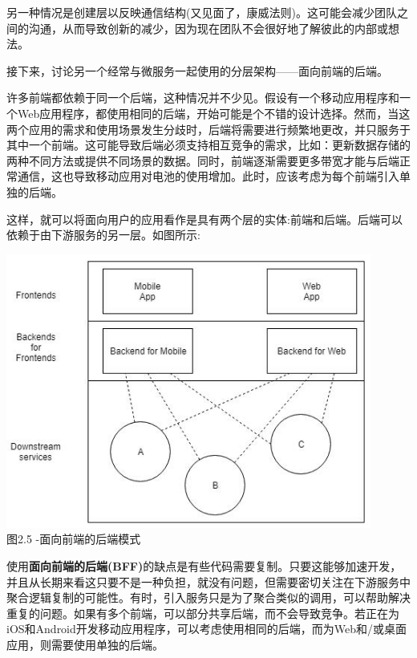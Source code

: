 另一种情况是创建层以反映通信结构(又见面了，康威法则)。这可能会减少团队之间的沟通，从而导致创新的减少，因为现在团队不会很好地了解彼此的内部或想法。

接下来，讨论另一个经常与微服务一起使用的分层架构——面向前端的后端。


许多前端都依赖于同一个后端，这种情况并不少见。假设有一个移动应用程序和一个Web应用程序，都使用相同的后端，开始可能是个不错的设计选择。然而，当这两个应用的需求和使用场景发生分歧时，后端将需要进行频繁地更改，并只服务于其中一个前端。这可能导致后端必须支持相互竞争的需求，比如：更新数据存储的两种不同方法或提供不同场景的数据。同时，前端逐渐需要更多带宽才能与后端正常通信，这也导致移动应用对电池的使用增加。此时，应该考虑为每个前端引入单独的后端。

这样，就可以将面向用户的应用看作是具有两个层的实体:前端和后端。后端可以依赖于由下游服务的另一层。如图所示:

\begin{center}
\includegraphics[width=0.9\textwidth]{content/1/chapter2/images/5.jpg}\\
图2.5 -面向前端的后端模式
\end{center}

使用\textbf{面向前端的后端(BFF)}的缺点是有些代码需要复制。只要这能够加速开发，并且从长期来看这只要不是一种负担，就没有问题，但需要密切关注在下游服务中聚合逻辑复制的可能性。有时，引入服务只是为了聚合类似的调用，可以帮助解决重复的问题。如果有多个前端，可以部分共享后端，而不会导致竞争。若正在为iOS和Android开发移动应用程序，可以考虑使用相同的后端，而为Web和/或桌面应用，则需要使用单独的后端。






















